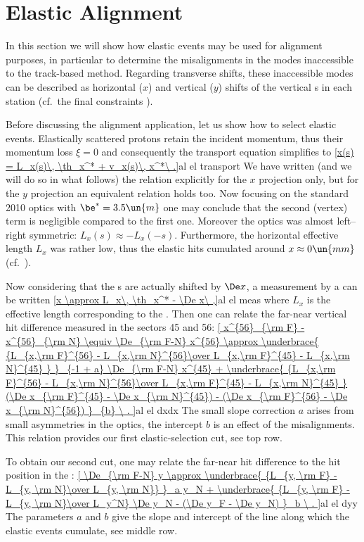 \section[al elast]{Elastic Alignment}

In this section we will show how elastic events may be used for alignment purposes, in particular to determine the misalignments in the modes inaccessible to the track-based method. Regarding transverse shifts, these inaccessible modes can be described as horizontal ($x$) and vertical ($y$) shifts of the vertical s in each station (cf.~the final constraints ).

Before discussing the alignment application, let us show how to select elastic events. Elastically scattered protons retain the incident momentum, thus their momentum loss $\xi = 0$ and consequently the transport equation  simplifies to
\eqref{x(s) = L_x(s)\, \th_x^* + v_x(s)\, x^*\ .}{al el transport}
We have written (and we will do so in what follows) the relation explicitly for the $x$ projection only, but for the $y$ projection an equivalent relation holds too. Now focusing on the standard 2010 optics with $\be^*=3.5\un{m}$ one may conclude that the second (vertex) term is negligible compared to the first one. Moreover the optics was almost left--right symmetric: $L_x(s) \approx - L_x(-s)$. Furthermore, the horizontal effective length $L_x$ was rather low, thus the elastic hits cumulated around $x\approx 0\un{mm}$ (cf.~).


Now considering that the s are actually shifted by $\De x$, a measurement by a  can be written
\eqref{x \approx L_x\, \th_x^* - \De x\ ,}{al el meas}
where $L_x$ is the effective length corresponding to the . Then one can relate the far-near vertical hit difference measured in the sectors 45 and 56:
\eqref{
	x^{56}_{\rm F} - x^{56}_{\rm N} \equiv \De_{\rm F-N} x^{56} \approx
	\underbrace{ {L_{x,\rm F}^{56} - L_{x,\rm N}^{56}\over L_{x,\rm F}^{45} - L_{x,\rm N}^{45} } }_{-1 + a} \De_{\rm F-N} x^{45} + 
	\underbrace{ {L_{x,\rm F}^{56} - L_{x,\rm N}^{56}\over L_{x,\rm F}^{45} - L_{x,\rm N}^{45} } (\De x_{\rm F}^{45} - \De x_{\rm N}^{45}) - (\De x_{\rm F}^{56} - \De x_{\rm N}^{56}) }_{b} \ .
}{al el dxdx}
The small slope correction $a$ arises from small asymmetries in the optics, the intercept $b$ is an effect of the  misalignments. This relation provides our first elastic-selection cut, see  top row.

To obtain our second cut, one may relate the far-near hit difference to the hit position in the :
\eqref{
	\De_{\rm F-N} y \approx
	\underbrace{ {L_{y, \rm F} - L_{y, \rm N}\over L_{y, \rm N}} }_a y_N 
	+ \underbrace{ {L_{y, \rm F} - L_{y, \rm N}\over L_y^N} \De y_N - (\De y_F - \De y_N) }_b \ .
}{al el dyy}
The parameters $a$ and $b$ give the slope and intercept of the line along which the elastic events cumulate, see  middle row.

